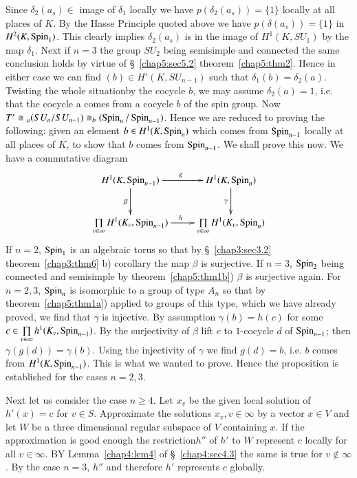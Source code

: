  Since $\delta_2 (a_s) \in$ image of $\delta_1$ locally we have
 $p(\delta_2 (a_s))=\{ 1\}$ locally at all places of $K$. By the Hasse
Principle quoted above we have $p(\delta(a_s))=\{ 1\}$ in
 $H^2(K,\operatorname{Spin}_1)$. This clearly implies $\delta_2(a_s)$ is in the
 image of $H^1(K,SU_1)$ by the map $\delta_1$. Next if $n=3$ the group
 $SU_2$ being semisimple and connected the same conclusion holds by
 virtue of \S~\ref{chap5:sec5.2} theorem~\ref{chap5:thm2}. Hence in
 either case we can find 
 $(b)\in H'(K, SU_{n-1})$ such that $\delta_1(b)=\delta_2(a)$. Twisting
 the whole situation\pageoriginale by the cocycle $b$, we may assume $\delta
 _2(a)=1$, i.e. that the cocycle a comes from a cocycle $b$ of the spin
 group. Now $T' \cong {}_a(SU_n/SU_{n-1})\cong_b(\operatorname{Spin}_n/
 \operatorname{Spin}_{n-1})$. Hence we are reduced to proving the following: given an
 element $b \in H^1 (K, \operatorname{Spin}_n)$ which comes from $\operatorname{Spin}_{n-1}$
 locally at all places of $K$, to show that $b$ comes from
 $\operatorname{Spin}_{n-1}$. We shall prove this now. We have a commutative diagram 
\[
\xymatrix{
H^1 (K, \Spin_{n-1}) \ar[r]^g \ar[d]_\beta & H^1 (K, \Spin_n)
\ar[d]_\gamma\\
\prod\limits_{v\in\infty} H^1 (K_v, \Spin_{n-1}) \ar[r]^h &
\prod\limits_{v\in\infty} H^1 (K_v, \Spin_n)
}
\]
  If $n=2$, $\operatorname{Spin}_1$ is an algebraic torus so that by 
\S~\ref{chap3:sec3.2} theorem~\ref{chap3:thm6} b) corollary the map
  $\beta$ is surjective. If $n=3$, $\operatorname{Spin}_2$ 
  being connected and semisimple by theorem~\ref{chap5:thm1b})
  $\beta$ is surjective 
  again. For $n = 2,3$, $\operatorname{Spin}_n$ is isomorphic to a group of type
  $A_n$ so that by theorem~\ref{chap5:thm1a}) applied to groups of
  this type, which we have already proved, we find that $\gamma$ 
  is injective. By  assumption 
  $\gamma(b)=h(c)$ for some $c \in \prod \limits_{v \in \infty}h^1
  (K_v, \operatorname{Spin}_{n-1})$. By the surjectivity of $\beta$ lift $c$ to
  $1$-cocycle $d$ of $\operatorname{Spin}_{n-1}$; then $\gamma(g(d))=\gamma
  (b)$. Using the injectivity of $\gamma$ we find $g(d)=b$, i.e. $b$
  comes from $H^1 (K, \operatorname{Spin}_{n-1})$. This is what we wanted to
  prove. Hence the proposition is established for the cases $n=2,3$.    
 
 
 Next let us consider the case $n \geq 4$. Let $x_v$ be the given
 local solution of $h'(x)=c$ for $v \in S$. Approximate the solutions
 $x_v, v \in \infty$ by a vector $x \in V$ and let $W$ be a three
 dimensional regular subspace of $V$ containing $x$. If the
 approximation is good enough the restriction\pageoriginale $h''$ of
 $h'$ to $W$ represent $c$ locally for all $v \in \infty$. BY 
 Lemma~\ref{chap4:lem4} of \S~\ref{chap4:sec4.3} the same is 
 true for $v \notin \infty$. By the
 case $n=3$, $h''$ and therefore $h'$ represents $c$ globally.  
 

